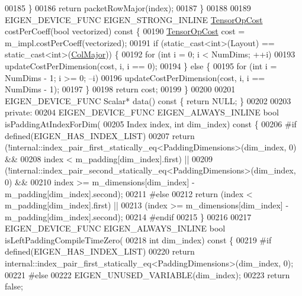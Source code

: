 \begin{DoxyCode}
00185     \}
00186     \textcolor{keywordflow}{return} packetRowMajor(index);
00187   \}
00188 
00189   EIGEN\_DEVICE\_FUNC EIGEN\_STRONG\_INLINE \hyperlink{class_eigen_1_1_tensor_op_cost}{TensorOpCost} costPerCoeff(\textcolor{keywordtype}{bool} vectorized)\textcolor{keyword}{ const }\{
00190     \hyperlink{class_eigen_1_1_tensor_op_cost}{TensorOpCost} cost = m\_impl.costPerCoeff(vectorized);
00191     \textcolor{keywordflow}{if} (static\_cast<int>(Layout) == static\_cast<int>(\hyperlink{group__enums_ggaacded1a18ae58b0f554751f6cdf9eb13a0cbd4bdd0abcfc0224c5fcb5e4f6669a}{ColMajor})) \{
00192       \textcolor{keywordflow}{for} (\textcolor{keywordtype}{int} i = 0; i < NumDims; ++i)
00193         updateCostPerDimension(cost, i, i == 0);
00194     \} \textcolor{keywordflow}{else} \{
00195       \textcolor{keywordflow}{for} (\textcolor{keywordtype}{int} i = NumDims - 1; i >= 0; --i)
00196         updateCostPerDimension(cost, i, i == NumDims - 1);
00197     \}
00198     \textcolor{keywordflow}{return} cost;
00199   \}
00200 
00201   EIGEN\_DEVICE\_FUNC Scalar* data()\textcolor{keyword}{ const }\{ \textcolor{keywordflow}{return} NULL; \}
00202 
00203  \textcolor{keyword}{private}:
00204   EIGEN\_DEVICE\_FUNC EIGEN\_ALWAYS\_INLINE \textcolor{keywordtype}{bool} isPaddingAtIndexForDim(
00205       Index index, \textcolor{keywordtype}{int} dim\_index)\textcolor{keyword}{ const }\{
00206 \textcolor{preprocessor}{#if defined(EIGEN\_HAS\_INDEX\_LIST)}
00207     \textcolor{keywordflow}{return} (!internal::index\_pair\_first\_statically\_eq<PaddingDimensions>(dim\_index, 0) &&
00208             index < m\_padding[dim\_index].first) ||
00209         (!internal::index\_pair\_second\_statically\_eq<PaddingDimensions>(dim\_index, 0) &&
00210          index >= m\_dimensions[dim\_index] - m\_padding[dim\_index].second);
00211 \textcolor{preprocessor}{#else}
00212     \textcolor{keywordflow}{return} (index < m\_padding[dim\_index].first) ||
00213            (index >= m\_dimensions[dim\_index] - m\_padding[dim\_index].second);
00214 \textcolor{preprocessor}{#endif}
00215   \}
00216 
00217   EIGEN\_DEVICE\_FUNC EIGEN\_ALWAYS\_INLINE \textcolor{keywordtype}{bool} isLeftPaddingCompileTimeZero(
00218       \textcolor{keywordtype}{int} dim\_index)\textcolor{keyword}{ const }\{
00219 \textcolor{preprocessor}{#if defined(EIGEN\_HAS\_INDEX\_LIST)}
00220     \textcolor{keywordflow}{return} internal::index\_pair\_first\_statically\_eq<PaddingDimensions>(dim\_index, 0);
00221 \textcolor{preprocessor}{#else}
00222     EIGEN\_UNUSED\_VARIABLE(dim\_index);
00223     \textcolor{keywordflow}{return} \textcolor{keyword}{false};

\end{DoxyCode}
